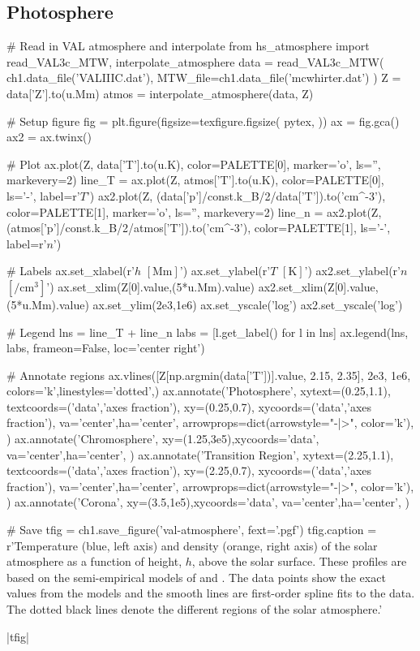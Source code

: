 \subsection{Photosphere}\label{sec:photosphere}

\begin{pycode}[chapter1]
# Read in VAL atmosphere and interpolate
from hs_atmosphere import read_VAL3c_MTW, interpolate_atmosphere
data = read_VAL3c_MTW(
    ch1.data_file('VALIIIC.dat'),
    MTW_file=ch1.data_file('mcwhirter.dat')
)
Z = data['Z'].to(u.Mm)
atmos = interpolate_atmosphere(data, Z)

# Setup figure
fig = plt.figure(figsize=texfigure.figsize(
    pytex,
))
ax = fig.gca()
ax2 = ax.twinx()

# Plot
ax.plot(Z, data['T'].to(u.K), color=PALETTE[0], marker='o', ls='', markevery=2)
line_T = ax.plot(Z, atmos['T'].to(u.K), color=PALETTE[0], ls='-', label=r'$T$')
ax2.plot(Z, (data['p']/const.k_B/2/data['T']).to('cm^-3'),
            color=PALETTE[1], marker='o', ls='', markevery=2)
line_n = ax2.plot(Z, (atmos['p']/const.k_B/2/atmos['T']).to('cm^-3'),
                    color=PALETTE[1], ls='-', label=r'$n$')

# Labels
ax.set_xlabel(r'$h$ $[\si{\mega\m}]$')
ax.set_ylabel(r'$T$ $[\si{\kelvin}]$')
ax2.set_ylabel(r'$n$ $[\si{\per\cubic\cm}]$')
ax.set_xlim(Z[0].value,(5*u.Mm).value)
ax2.set_xlim(Z[0].value,(5*u.Mm).value)
ax.set_ylim(2e3,1e6)
ax.set_yscale('log')
ax2.set_yscale('log')

# Legend
lns = line_T + line_n
labs = [l.get_label() for l in lns]
ax.legend(lns, labs, frameon=False, loc='center right')

# Annotate regions
ax.vlines([Z[np.argmin(data['T'])].value, 2.15, 2.35], 2e3, 1e6,
            colors='k',linestyles='dotted',)
ax.annotate('Photosphere',
            xytext=(0.25,1.1), textcoords=('data','axes fraction'),
            xy=(0.25,0.7), xycoords=('data','axes fraction'),
            va='center',ha='center',
            arrowprops=dict(arrowstyle="-|>", color='k'),
)
ax.annotate('Chromosphere',
            xy=(1.25,3e5),xycoords='data',
            va='center',ha='center',
)
ax.annotate('Transition Region',
            xytext=(2.25,1.1), textcoords=('data','axes fraction'),
            xy=(2.25,0.7), xycoords=('data','axes fraction'),
            va='center',ha='center',
            arrowprops=dict(arrowstyle="-|>", color='k'),
)
ax.annotate('Corona',
            xy=(3.5,1e5),xycoords='data',
            va='center',ha='center',
)

# Save
tfig = ch1.save_figure('val-atmosphere', fext='.pgf')
tfig.caption = r'Temperature (blue, left axis) and density (orange, right axis) of the solar atmosphere as a function of height, $h$, above the solar surface. These profiles are based on the semi-empirical models of \citet{mcwhirter_heating_1975} and \citet{vernazza_structure_1981}. The data points show the exact values from the models and the smooth lines are first-order spline fits to the data. The dotted black lines denote the different regions of the solar atmosphere.'
\end{pycode}
\py[chapter1]|tfig|

